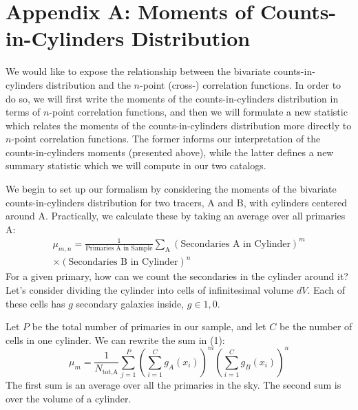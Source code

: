 \documentclass[fleqn,usenatbib]{mnras}
\begin{document}
\section*{Appendix A: Moments of Counts-in-Cylinders Distribution}
We would like to expose the relationship between the bivariate counts-in-cylinders distribution and the $n$-point (cross-) correlation functions. In order to do so, we will first write the moments of the counts-in-cylinders distribution in terms of $n$-point correlation functions, and then we will formulate a new statistic which relates the moments of the counts-in-cylinders distribution more directly to $n$-point correlation functions. The former informs our interpretation of the counts-in-cylinders moments (presented above), while the latter defines a new summary statistic which we will compute in our two catalogs.

We begin to set up our formalism by considering the moments of the bivariate counts-in-cylinders distribution for two tracers, A and B, with cylinders centered around A. Practically, we calculate these by taking an average over all primaries A:
\begin{multline}
\mu_{m,n} = \frac{1}{\text{Primaries A in Sample}}\sum_{\text{A}}(\text{Secondaries A in Cylinder})^m \\
\times(\text{Secondaries B in Cylinder})^n
\end{multline}
For a given primary, how can we count the secondaries in the cylinder around it? Let's consider dividing the cylinder into cells of infinitesimal volume $dV$. Each of these cells has $g$ secondary galaxies inside, $g \in {1,0}$.

Let $P$ be the total number of primaries in our sample, and let $C$ be the number of cells in one cylinder. We can rewrite the sum in (1):
\begin{equation}
\mu_m = \frac{1}{N_{\text{tot,A}}}\sum_{j=1}^P \left(\sum_{i=1}^C g_A(x_i)\right)^m\left(\sum_{i=1}^C g_B(x_i)\right)^n
\end{equation}
The first sum is an average over all the primaries in the sky. The second sum is over the volume of a cylinder.
\end{document}
